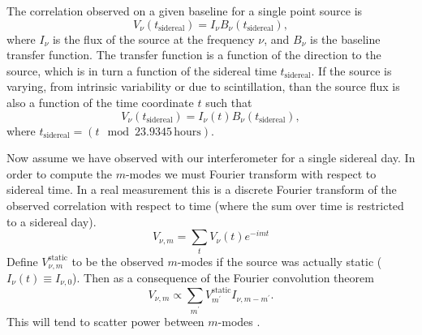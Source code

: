 \documentclass[twocolumn]{aastex61}
\newcommand{\todo}[1]{\textcolor{red}{TODO: #1}\PackageWarning{TODO:}{#1!}}
\begin{document}
The correlation observed on a given baseline for a single point source is
\begin{equation}
    V_\nu(t_{\textrm{sidereal}}) = I_\nu B_\nu(t_{\textrm{sidereal}}),
\end{equation}
where $I_\nu$ is the flux of the source at the frequency $\nu$, and $B_\nu$ is the baseline transfer
function. The transfer function is a function of the direction to the source, which is in turn a
function of the sidereal time $t_{\textrm{sidereal}}$. If the source is varying, from intrinsic
variability or due to scintillation, than the source flux is also a function of the time coordinate
$t$ such that
\begin{equation}
    V_\nu(t_{\textrm{sidereal}}) = I_\nu(t) B_\nu(t_{\textrm{sidereal}}),
\end{equation}
where $t_{\textrm{sidereal}} = (t \mod 23.9345\,\textrm{hours})$.

Now assume we have observed with our interferometer for a single sidereal day.  In order to compute
the $m$-modes we must Fourier transform with respect to sidereal time. In a real measurement this is
a discrete Fourier transform of the observed correlation with respect to time (where the sum over
time is restricted to a sidereal day).
\begin{equation}
    V_{\nu, m} = \sum_{t} V_\nu(t) e^{-imt}
\end{equation}
Define $V_{\nu, m}^{\textrm{static}}$ to be the observed $m$-modes if the source was actually static
($I_\nu(t) \equiv I_{\nu,0}$). Then as a consequence of the Fourier convolution theorem
\begin{equation}
    V_{\nu, m} \propto \sum_{m^\prime} V_{m^\prime}^\textrm{static} I_{\nu, m-m^\prime}.
\end{equation}
This will tend to scatter power between $m$-modes \citep{richard_ionosphere_thoughts}.

%

%
\end{document}
